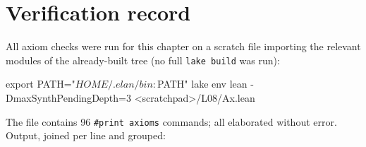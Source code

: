 \section{Verification record}\label{l08:sec:verification}

All axiom checks were run for this chapter on a scratch file importing the relevant modules of the
already-built tree (no full \texttt{lake build} was run):
\begin{plaincode}
export PATH="$HOME/.elan/bin:$PATH"
lake env lean -DmaxSynthPendingDepth=3 <scratchpad>/L08/Ax.lean
\end{plaincode}
The file contains 96 \texttt{\#print axioms} commands; all elaborated without error. Output, joined
per line and grouped:
